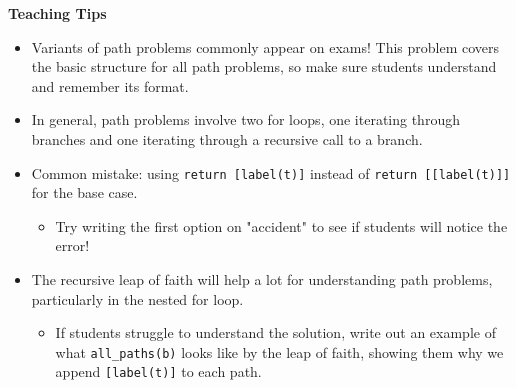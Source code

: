 \begin{questionmeta}
  \textbf{Teaching Tips}
  \begin{itemize}
      \item Variants of path problems commonly appear on exams! This problem covers the basic structure for all path problems, so make sure students understand and remember its format.
      \item In general, path problems involve two for loops, one iterating through branches and one iterating through a recursive call to a branch.
      \item Common mistake: using \lstinline$return [label(t)]$ instead of \lstinline$return [[label(t)]]$ for the base case.
      \begin{itemize}
          \item Try writing the first option on "accident" to see if students will notice the error!
      \end{itemize}
      \item The recursive leap of faith will help a lot for understanding path problems, particularly in the nested for loop.
      \begin{itemize}
        \item If students struggle to understand the solution, write out an example of what \lstinline$all_paths(b)$ looks like by the leap of faith, showing them why we append \lstinline$[label(t)]$ to each path.
      \end{itemize}
  \end{itemize}
\end{questionmeta}